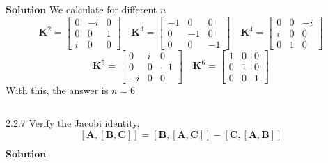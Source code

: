 $\boxed{\textbf{Solution}}$ We calculate for different $n$
$$\mathbf{K}^2 = \begin{bmatrix}{0} & {-i} & {0} \\ {0} & {0} & {1} \\ {i} & {0} & {0}\end{bmatrix} \quad \mathbf{K}^3=\begin{bmatrix}{-1} & {0} & {0} \\ {0} & {-1} & {0} \\ {0} & {0} & {-1}\end{bmatrix} \quad \mathbf{K}^4 = \begin{bmatrix}{0} & {0} & {-i} \\ {i} & {0} & {0} \\ {0} & {1} & {0}\end{bmatrix}$$
$$\mathbf{K}^5 = \begin{bmatrix}{0} & {i} & {0} \\ {0} & {0} & {-1} \\ {-i} & {0} & {0}\end{bmatrix} \quad \mathbf{K}^6 = \begin{bmatrix}{1} & {0} & {0} \\ {0} & {1} & {0} \\ {0} & {0} & {1}\end{bmatrix}$$
With this, the answer is $n=6$


$$$$

\begin{mybox}{2.2.7}
Verify the Jacobi identity,
$$[\mathbf{A},[\mathbf{B}, \mathbf{C}]]=[\mathbf{B},[\mathbf{A}, \mathbf{C}]]-[\mathbf{C},[\mathbf{A}, \mathbf{B}]]$$
\end{mybox}

$\boxed{\textbf{Solution}}$ 

